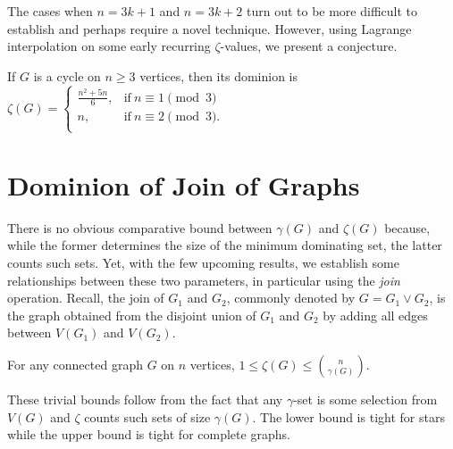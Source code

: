 \documentclass[twoside,12pt]{article}
\begin{document}
\begin{remark}

\end{remark}
The cases when $n=3k+1$ and $n=3k+2$ turn out to be more difficult to establish and perhaps require a novel technique. However, using Lagrange interpolation on some early recurring $\zeta$-values, we present a conjecture.

\begin{conjecture}{\label{cj1}}
	If $G$ is a cycle on $n\ge 3$ vertices, then its dominion is \\
	
	$\zeta(G)=\begin{cases} 
	\frac{n^2+5n}{6}, & \text{if} \ n \equiv 1\pmod3 \\
	n, &  \text{if} \ n \equiv 2\pmod3. \\
		\end{cases}$
\end{conjecture}



\section{Dominion of Join of Graphs }
There is no obvious comparative bound between $\gamma(G)$ and $\zeta(G)$ because, while the former determines the size of the minimum dominating set, the latter counts such sets. Yet, with the few upcoming results, we establish some relationships between these two parameters, in particular using the \textit{join} operation. Recall, the join of $G_1$ and $G_2$, commonly denoted by $G = G_1 \vee G_2$,  is the graph obtained from the disjoint union of $G_1$ and $G_2$ by adding all edges between $V(G_1)$ and $V(G_2)$.

\begin{proposition}{\label{Prop2}}
	For any  connected graph $G$ on $n$ vertices, $1\le \zeta(G)\le {n\choose \gamma(G)}$.
	
\end{proposition}
These trivial bounds follow from the fact that any $\gamma$-set is some selection from $V(G)$ and  $\zeta$ counts such sets of size $\gamma(G)$. The lower bound is tight for stars while the upper bound is tight for complete graphs.
\end{document}
